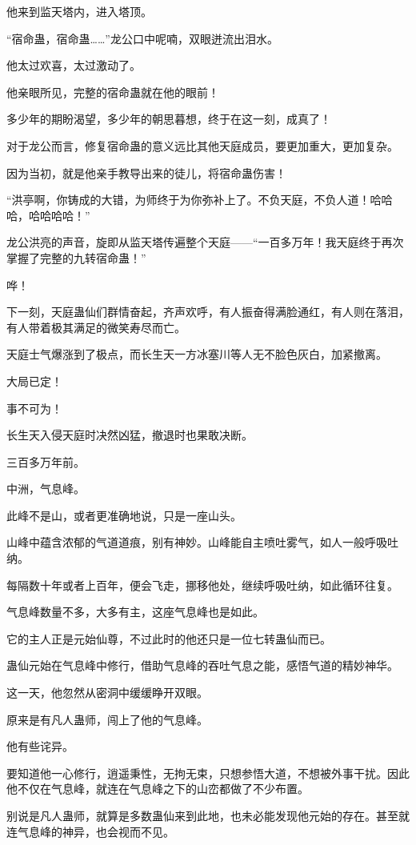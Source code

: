 \begin{this_body}
他来到监天塔内，进入塔顶。

“宿命蛊，宿命蛊……”龙公口中呢喃，双眼迸流出泪水。

他太过欢喜，太过激动了。

他亲眼所见，完整的宿命蛊就在他的眼前！

多少年的期盼渴望，多少年的朝思暮想，终于在这一刻，成真了！

对于龙公而言，修复宿命蛊的意义远比其他天庭成员，要更加重大，更加复杂。

因为当初，就是他亲手教导出来的徒儿，将宿命蛊伤害！

“洪亭啊，你铸成的大错，为师终于为你弥补上了。不负天庭，不负人道！哈哈哈，哈哈哈哈！”

龙公洪亮的声音，旋即从监天塔传遍整个天庭——“一百多万年！我天庭终于再次掌握了完整的九转宿命蛊！”

哗！

下一刻，天庭蛊仙们群情奋起，齐声欢呼，有人振奋得满脸通红，有人则在落泪，有人带着极其满足的微笑寿尽而亡。

天庭士气爆涨到了极点，而长生天一方冰塞川等人无不脸色灰白，加紧撤离。

大局已定！

事不可为！

长生天入侵天庭时决然凶猛，撤退时也果敢决断。

三百多万年前。

中洲，气息峰。

此峰不是山，或者更准确地说，只是一座山头。

山峰中蕴含浓郁的气道道痕，别有神妙。山峰能自主喷吐雾气，如人一般呼吸吐纳。

每隔数十年或者上百年，便会飞走，挪移他处，继续呼吸吐纳，如此循环往复。

气息峰数量不多，大多有主，这座气息峰也是如此。

它的主人正是元始仙尊，不过此时的他还只是一位七转蛊仙而已。

蛊仙元始在气息峰中修行，借助气息峰的吞吐气息之能，感悟气道的精妙神华。

这一天，他忽然从密洞中缓缓睁开双眼。

原来是有凡人蛊师，闯上了他的气息峰。

他有些诧异。

要知道他一心修行，逍遥秉性，无拘无束，只想参悟大道，不想被外事干扰。因此他不仅在气息峰，就连在气息峰之下的山峦都做了不少布置。

别说是凡人蛊师，就算是多数蛊仙来到此地，也未必能发现他元始的存在。甚至就连气息峰的神异，也会视而不见。


\end{this_body}
